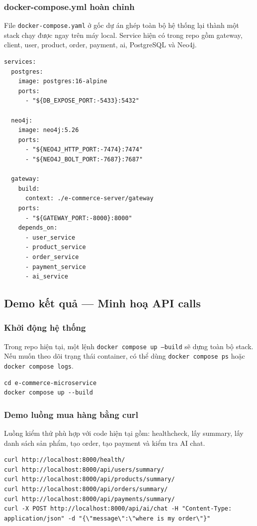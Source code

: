 \documentclass[12pt,a4paper]{article}
\begin{document}
\subsubsection{docker-compose.yml hoàn chỉnh}
File \texttt{docker-compose.yaml} ở gốc dự án ghép toàn bộ hệ thống lại thành một stack chạy được ngay trên máy local. Service hiện có trong repo gồm gateway, client, user, product, order, payment, ai, PostgreSQL và Neo4j.

\begin{lstlisting}[style=code,caption={Trích cấu hình docker compose thực tế của repo}]
services:
  postgres:
    image: postgres:16-alpine
    ports:
      - "${DB_EXPOSE_PORT:-5433}:5432"

  neo4j:
    image: neo4j:5.26
    ports:
      - "${NEO4J_HTTP_PORT:-7474}:7474"
      - "${NEO4J_BOLT_PORT:-7687}:7687"

  gateway:
    build:
      context: ./e-commerce-server/gateway
    ports:
      - "${GATEWAY_PORT:-8000}:8000"
    depends_on:
      - user_service
      - product_service
      - order_service
      - payment_service
      - ai_service
\end{lstlisting}

\subsection{Demo kết quả --- Minh hoạ API calls}
\subsubsection{Khởi động hệ thống}
Trong repo hiện tại, một lệnh \texttt{docker compose up --build} sẽ dựng toàn bộ stack. Nếu muốn theo dõi trạng thái container, có thể dùng \texttt{docker compose ps} hoặc \texttt{docker compose logs}.

\begin{lstlisting}[style=code,caption={Khởi động toàn bộ hệ thống}]
cd e-commerce-microservice
docker compose up --build
\end{lstlisting}

\subsubsection{Demo luồng mua hàng bằng curl}
Luồng kiểm thử phù hợp với code hiện tại gồm: healthcheck, lấy summary, lấy danh sách sản phẩm, tạo order, tạo payment và kiểm tra AI chat.

\begin{lstlisting}[style=code,caption={Một số lệnh kiểm thử API}]
curl http://localhost:8000/health/
curl http://localhost:8000/api/users/summary/
curl http://localhost:8000/api/products/summary/
curl http://localhost:8000/api/orders/summary/
curl http://localhost:8000/api/payments/summary/
curl -X POST http://localhost:8000/api/ai/chat -H "Content-Type: application/json" -d "{\"message\":\"where is my order\"}"
\end{lstlisting}
\end{document}
